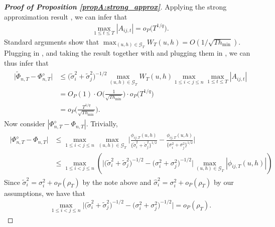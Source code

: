 \documentclass[a4paper,12pt]{article}
\makeatletter
\renewcommand{\eqref}[1]{\tagform@{\ref{#1}}}
\makeatother
\begin{document}
\begin{proof}[\textnormal{\textbf{Proof of Proposition \ref{propA:strong_approx}}}]
Applying the strong approximation result \eqref{eq-strongapprox-dep}, we can infer that
\begin{align}\label{max_At}
\max_{1 \le t \le T} |A_{ij, t}|  =o_P\big(T^{1/q}\big). 
\end{align}
Standard arguments show that $\max_{(u,h) \in \mathcal{G}_T} W_T(u,h) = O( 1/\sqrt{Th_{\min}} )$. Plugging \eqref{max_At} in \eqref{eq-strongapprox-bound3}, and taking the result together with \eqref{eqA:strong_approx:bound3} and plugging them in \eqref{eqA:strong_approx:bound2}, we can thus infer that 
\begin{align}\label{eq-strongapprox-bound4}
\begin{split}
\big| \widetilde{\Phi}_{n, T} - \Phi_{n, T}^{\diamond} \big| &\le \big(\widetilde{\sigma}_i^2 + \widetilde{\sigma}_j^2 \big)^{-1/2}  \max_{(u,h) \in \mathcal{G}_T} W_T(u, h) \max_{1\le i < j \le n}\max_{1\le t \le T} |A_{ij, t}|\\
& = O_P(1) \cdot O\Big(\frac{1}{\sqrt{Th_{\min}}} \Big) \cdot o_P\big(T^{1/q}\big)\\
&= o_P\Big( \frac{T^{1/q}}{\sqrt{Th_{\min}}} \Big).
\end{split}
\end{align}
Now consider $|\Phi_{n, T}^{\diamond} - \Phi_{n, T}|$. Trivially,
\begin{align}\label{eqA:strong_approx:bound5}
\begin{split}
\big| \Phi_{n, T}^{\diamond} - \Phi_{n, T} \big| &\le \max_{1\leq i< j \leq n}\max_{(u,h) \in \mathcal{G}_T} \Big|\frac{\phi_{ij, T}(u,h)}{\{\widetilde{\sigma}_i^2 + \widetilde{\sigma}_j^2 \}^{1/2}} - \frac{\phi_{ij, T}(u,h)}{\{{\sigma}_i^2 + {\sigma}_j^2 \}^{1/2}}\Big|\\
&\le\max_{1 \le i < j \le n} \left( \Big|\big(\widetilde{\sigma}_i^2 + \widetilde{\sigma}_j^2 \big)^{-1/2} - \big(\sigma_i^2 + \sigma_j^2 \big)^{-1/2}\Big| \max_{(u,h) \in \mathcal{G}_T} \left|\phi_{ij,T}(u,h)\right|\right)
\end{split}
\end{align}
Since $\widetilde{\sigma}_i^2 = \sigma_i^2 + o_P(\rho_T)$ by the note above and $\widehat{\sigma}_i^2 = \sigma_i^2 + o_P(\rho_T)$ by our assumptions, we have that 
\begin{align}\label{eqA:strong_approx:bound6}
\max_{1 \le i < j \le n} \Big|\big(\widetilde{\sigma}_i^2 + \widetilde{\sigma}_j^2 \big)^{-1/2} - \big(\sigma_i^2 + \sigma_j^2 \big)^{-1/2}\Big| = o_P(\rho_T).
\end{align}

\end{proof}
\end{document}
